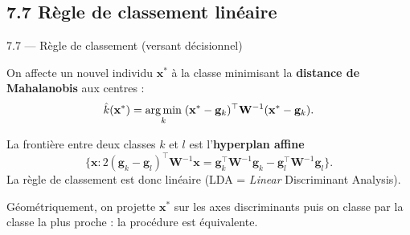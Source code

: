 \subsection{7.7 Règle de classement linéaire}
\begin{frame}{7.7 — Règle de classement (versant décisionnel)}
\begin{definition}
On affecte un nouvel individu $\mathbf{x}^*$ à la classe minimisant la
\textbf{distance de Mahalanobis} aux centres :
\[
\hat{k}(\mathbf{x}^*) = \operatorname*{arg\,min}_{k}
\;(\mathbf{x}^* - \mathbf{g}_k)^\top \mathbf{W}^{-1} (\mathbf{x}^* - \mathbf{g}_k).
\]
\end{definition}

\begin{theorem}
La frontière entre deux classes $k$ et $l$ est l'\textbf{hyperplan affine}
\[
\bigl\{\mathbf{x} : 2(\mathbf{g}_k - \mathbf{g}_l)^\top \mathbf{W}^{-1} \mathbf{x}
= \mathbf{g}_k^\top \mathbf{W}^{-1} \mathbf{g}_k - \mathbf{g}_l^\top \mathbf{W}^{-1} \mathbf{g}_l \bigr\}.
\]
La règle de classement est donc \alert{linéaire} (LDA = \emph{Linear} Discriminant Analysis).
\end{theorem}

\begin{rema}
\small Géométriquement, on projette $\mathbf{x}^*$ sur les axes discriminants
puis on classe par la classe la plus proche : la procédure est équivalente.
\end{rema}
\end{frame}

